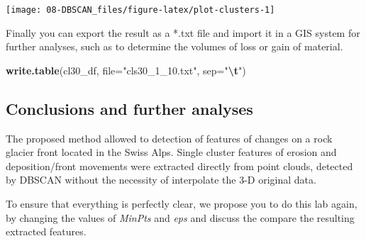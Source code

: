 \documentclass[
]{article}
\newenvironment{Shaded}{\begin{snugshade}}{\end{snugshade}}
\newcommand{\AttributeTok}[1]{\textcolor[rgb]{0.13,0.29,0.53}{#1}}
\newcommand{\CommentTok}[1]{\textcolor[rgb]{0.56,0.35,0.01}{\textit{#1}}}
\newcommand{\FunctionTok}[1]{\textcolor[rgb]{0.13,0.29,0.53}{\textbf{#1}}}
\newcommand{\NormalTok}[1]{#1}
\newcommand{\SpecialCharTok}[1]{\textcolor[rgb]{0.81,0.36,0.00}{\textbf{#1}}}
\newcommand{\StringTok}[1]{\textcolor[rgb]{0.31,0.60,0.02}{#1}}
\begin{document}
\begin{center}\texttt{[image: 08-DBSCAN\_files/figure-latex/plot-clusters-1]} \end{center}

\begin{Shaded}
\end{Shaded}

Finally you can export the result as a *.txt file and import it in a GIS system for further analyses, such as to determine the volumes of loss or gain of material.

\begin{Shaded}
\begin{Highlighting}[]
\FunctionTok{write.table}\NormalTok{(cl30\_df, }\AttributeTok{file=}\StringTok{"cls30\_1\_10.txt"}\NormalTok{, }\AttributeTok{sep=}\StringTok{"}\SpecialCharTok{\textbackslash{}t}\StringTok{"}\NormalTok{)}
\end{Highlighting}
\end{Shaded}

\subsection{Conclusions and further analyses}\label{conclusions-and-further-analyses-4}

The proposed method allowed to detection of features of changes on a rock glacier front located in the Swiss Alps.
Single cluster features of erosion and deposition/front movements were extracted directly from point clouds, detected by DBSCAN without the necessity of interpolate the 3-D original data.

To ensure that everything is perfectly clear, we propose you to do this lab again, by changing the values of \emph{MinPts} and \emph{eps} and discuss the compare the resulting extracted features.

  
\end{document}
